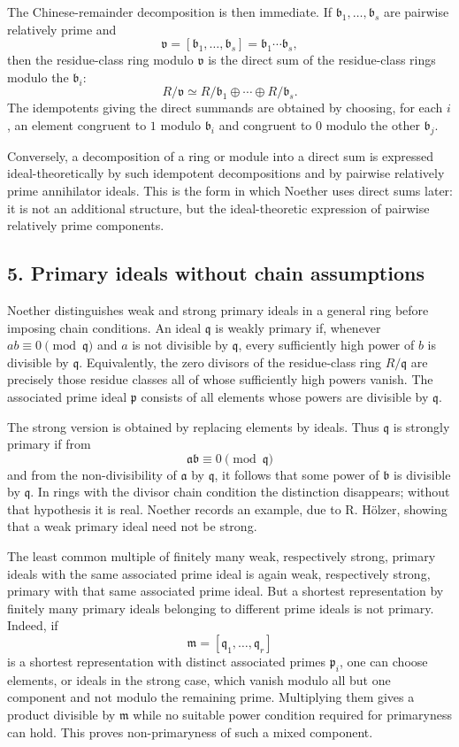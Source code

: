 \documentclass[12pt]{article}
\begin{document}
The Chinese-remainder decomposition is then immediate. If $\mathfrak b_1,
\ldots,\mathfrak b_s$ are pairwise relatively prime and
\[
  \mathfrak v=[\mathfrak b_1,\ldots,\mathfrak b_s]=\mathfrak b_1\cdots\mathfrak b_s,
\]
then the residue-class ring modulo $\mathfrak v$ is the direct sum of the residue-class rings modulo the $\mathfrak b_i$:
\[
  R/\mathfrak v \simeq R/\mathfrak b_1\oplus\cdots\oplus R/\mathfrak b_s.
\]
The idempotents giving the direct summands are obtained by choosing, for each $i$, an element congruent to $1$ modulo $\mathfrak b_i$ and congruent to $0$ modulo the other $\mathfrak b_j$.

Conversely, a decomposition of a ring or module into a direct sum is expressed ideal-theoretically by such idempotent decompositions and by pairwise relatively prime annihilator ideals. This is the form in which Noether uses direct sums later: it is not an additional structure, but the ideal-theoretic expression of pairwise relatively prime components.

\subsection{5. Primary ideals without chain assumptions}

Noether distinguishes weak and strong primary ideals in a general ring before imposing chain conditions. An ideal $\mathfrak q$ is weakly primary if, whenever $ab\equiv0\pmod{\mathfrak q}$ and $a$ is not divisible by $\mathfrak q$, every sufficiently high power of $b$ is divisible by $\mathfrak q$. Equivalently, the zero divisors of the residue-class ring $R/\mathfrak q$ are precisely those residue classes all of whose sufficiently high powers vanish. The associated prime ideal $\mathfrak p$ consists of all elements whose powers are divisible by $\mathfrak q$.

The strong version is obtained by replacing elements by ideals. Thus $\mathfrak q$ is strongly primary if from
\[
  \mathfrak a\mathfrak b\equiv0\pmod{\mathfrak q}
\]
and from the non-divisibility of $\mathfrak a$ by $\mathfrak q$, it follows that some power of $\mathfrak b$ is divisible by $\mathfrak q$. In rings with the divisor chain condition the distinction disappears; without that hypothesis it is real. Noether records an example, due to R. Hölzer, showing that a weak primary ideal need not be strong.

The least common multiple of finitely many weak, respectively strong, primary ideals with the same associated prime ideal is again weak, respectively strong, primary with that same associated prime ideal. But a shortest representation by finitely many primary ideals belonging to different prime ideals is not primary. Indeed, if
\[
  \mathfrak m=[\mathfrak q_1,
\ldots,\mathfrak q_r]
\]
is a shortest representation with distinct associated primes $\mathfrak p_i$, one can choose elements, or ideals in the strong case, which vanish modulo all but one component and not modulo the remaining prime. Multiplying them gives a product divisible by $\mathfrak m$ while no suitable power condition required for primaryness can hold. This proves non-primaryness of such a mixed component.
\end{document}
